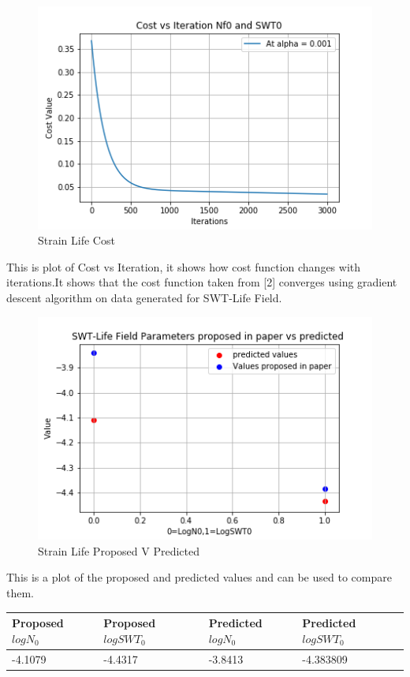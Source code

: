 \documentclass[11pt]{article}
\begin{document}
\begin{figure}
\centering
\includegraphics{images/costviterswt.png}
\caption{Strain Life Cost}
\end{figure}

This is plot of Cost vs Iteration, it shows how cost function changes
with iterations.It shows that the cost function taken from {[}2{]}
converges using gradient descent algorithm on data generated for
SWT-Life Field.

\begin{figure}
\centering
\includegraphics{images/SWTLifePropvPred.png}
\caption{Strain Life Proposed V Predicted}
\end{figure}

This is a plot of the proposed and predicted values and can be used to
compare them.

\begin{longtable}[]{@{}llll@{}}
\toprule
Proposed \(logN_0\) & Proposed \(logSWT_0\) & Predicted \(logN_0\) &
Predicted \(logSWT_0\)\tabularnewline
\midrule
\endhead
-4.1079 & -4.4317 & -3.8413 & -4.383809\tabularnewline
\bottomrule
\end{longtable}
\end{document}
